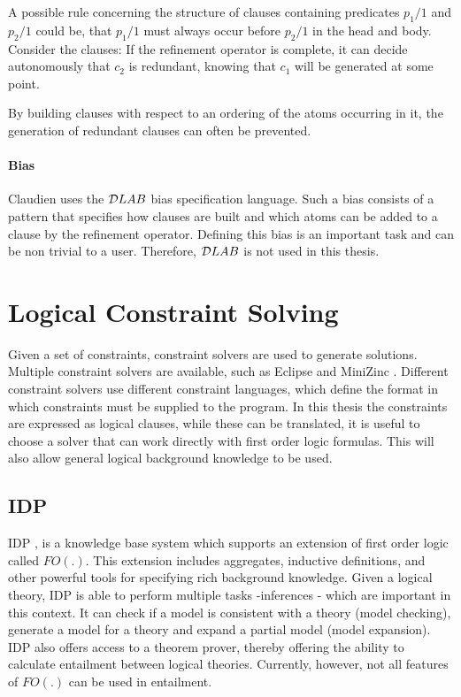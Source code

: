\begin{example}
A possible rule concerning the structure of clauses containing predicates $p_1/1$ and $p_2/1$ could be, that $p_1/1$ must always occur before $p_2/1$ in the head and body.
Consider the clauses:
If the refinement operator is complete, it can decide autonomously that $c_2$ is redundant, knowing that $c_1$ will be generated at some point.
\end{example}

By building clauses with respect to an ordering of the atoms occurring in it, the generation of redundant clauses can often be prevented.

\paragraph{Bias}
Claudien uses the $\mathcal{D}LAB$ bias specification language.
Such a bias consists of a pattern that specifies how clauses are built and which atoms can be added to a clause by the refinement operator.
Defining this bias is an important task and can be non trivial to a user.
Therefore, $\mathcal{D}LAB$ is not used in this thesis.

\section{Logical Constraint Solving}
\label{sec:logical_constraint_solving}
Given a set of constraints, constraint solvers are used to generate solutions.
Multiple constraint solvers are available, such as Eclipse \cite{apt2006constraint} and MiniZinc \cite{nethercote2007minizinc}.
Different constraint solvers use different constraint languages, which define the format in which constraints must be supplied to the program.
In this thesis the constraints are expressed as logical clauses, while these can be translated, it is useful to choose a solver that can work directly with first order logic formulas.
This will also allow general logical background knowledge to be used.

\subsection{IDP}
IDP \cite{de2013prototype}, \cite{wittocx2008idp} is a knowledge base system which supports an extension of first order logic called $FO(.)$.
This extension includes aggregates, inductive definitions, and other powerful tools for specifying rich background knowledge.
Given a logical theory, IDP is able to perform multiple tasks -inferences - which are important in this context.
It can check if a model is consistent with a theory (model checking), generate a model for a theory and expand a partial model (model expansion).
IDP also offers access to a theorem prover, thereby offering the ability to calculate entailment between logical theories.
Currently, however, not all features of $FO(.)$ can be used in entailment.

